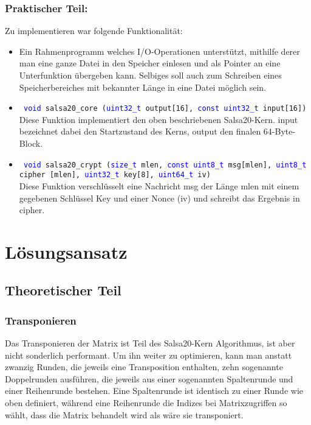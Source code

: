 \documentclass[course=erap]{aspdoc}
\begin{document}
\subsubsection{Praktischer Teil:}
Zu implementieren  war folgende Funktionalität:
\begin{itemize}
    \item Ein Rahmenprogramm welches I/O-Operationen unterstützt, mithilfe derer man eine ganze Datei in den Speicher einlesen und als Pointer an eine Unterfunktion übergeben kann. Selbiges soll auch zum Schreiben eines Speicherbereiches mit bekannter Länge in eine Datei möglich sein.
    \item \texttt{ \textcolor{blue}{void} salsa20\_core (\textcolor{blue} {uint32\_t} output[16], \textcolor{blue}{const uint32\_t} input[16])} \\
    Diese Funktion implementiert den oben beschriebenen Salsa20-Kern. input bezeichnet dabei den Startzustand des Kerns, output den finalen 64-Byte-Block. \\
    \item \texttt{ \textcolor{blue} {void} salsa20\_crypt (\textcolor{blue}{size\_t} mlen, \textcolor{blue} {const uint8\_t} msg[mlen], \textcolor{blue}{uint8\_t} cipher [mlen], \textcolor{blue}{uint32\_t} key[8], \textcolor{blue} {uint64\_t} iv) }\\
    Diese Funktion verschlüsselt eine Nachricht msg der Länge mlen mit einem gegebenen Schlüssel Key und einer Nonce (iv) und schreibt das Ergebnis in cipher.
\end{itemize}



\section{Lösungsansatz}
\subsection{Theoretischer Teil}
\subsubsection{Transponieren}

Das Transponieren der Matrix ist Teil des Salsa20-Kern Algorithmus, ist aber nicht sonderlich performant.
Um ihn weiter zu optimieren, kann man anstatt zwanzig Runden, die jeweils eine Transposition enthalten, zehn sogenannte Doppelrunden
ausführen, die jeweils aus einer sogenannten Spaltenrunde und einer Reihenrunde bestehen. Eine Spaltenrunde ist identisch zu einer
Runde wie oben definiert, während eine Reihenrunde die Indizes bei Matrixzugriffen so wählt, dass die Matrix behandelt wird
als wäre sie transponiert.
\end{document}
